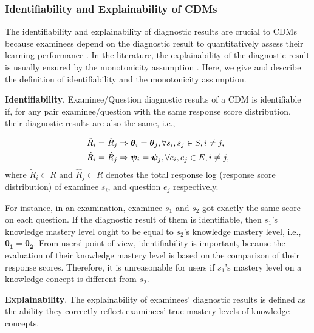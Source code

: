 \documentclass[sigconf]{acmart}
\begin{document}
\subsubsection{Identifiability and Explainability of CDMs}\label{sec:Assumption}
\par The identifiability and explainability of diagnostic results are crucial to CDMs because examinees depend on the diagnostic result to quantitatively assess their learning performance \cite{Xu2018,Xu2019identifiability,Reckase2009,WangF2022}. In the literature, the explainability of the diagnostic result is usually ensured by the monotonicity assumption \cite{Reckase2009,WangF2022}. Here, we give and describe the definition of identifiability and the monotonicity assumption.
\vspace{-5pt}
\begin{definition}\label{def:identifiability}
  \textbf{Identifiability}. Examinee/Question diagnostic results of a CDM is identifiable if, for any pair examinee/question with the same response score distribution, their diagnostic results are also the same, i.e.,

  \vspace{-5pt}
  \begin{equation}
    \begin{aligned}
      \tilde{R}_i = \tilde{R}_j &\Rightarrow \bm{\theta}_i = \bm{\theta}_j, \forall s_i, s_j \in S, i\neq j, \\
      \hat{R}_i = \hat{R}_j &\Rightarrow \bm{\psi}_i = \bm{\psi}_j, \forall e_i, e_j \in E, i\neq j, \\
    \end{aligned}
    \vspace{-5pt}
  \end{equation}
  where $\tilde{R}_i\subset R$ and $\hat{R}_j\subset R$ denotes the total response log (response score distribution) of examinee $s_i$, and question $e_j$ respectively.
\end{definition}
\vspace{-5pt}
\par For instance, in an examination, examinee $s_1$ and $s_2$ got exactly the same score on each question. If the diagnostic result of them is identifiable, then $s_1$'s knowledge mastery level ought to be equal to $s_2$'s knowledge mastery level, i.e., $\bm{\theta_1} = \bm{\theta_2}$. From users' point of view, identifiability is important, because the evaluation of their knowledge mastery level is based on the comparison of their response scores. Therefore, it is unreasonable for users if $s_1$'s mastery level on a knowledge concept is different from $s_2$.
\vspace{-5pt}
\begin{definition}\label{def:explainability}
  \textbf{Explainability}. The explainability of examinees' diagnostic results is defined as the ability they correctly reflect examinees' true mastery levels of knowledge concepts.
  \vspace{-5pt}
\end{definition}
\end{document}
